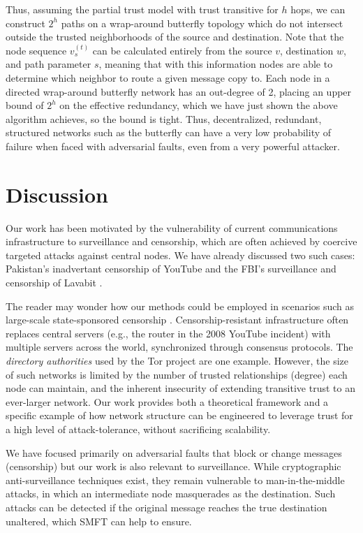 \documentclass[10pt,letterpaper]{article}
\begin{document}
Thus, assuming the partial trust model with trust transitive
for $h$ hops, we can construct $2^h$ paths on a wrap-around butterfly topology
which do not intersect outside the trusted neighborhoods of the source and
destination.
Note that the node sequence $v_s^{(t)}$ can be calculated entirely
from the source $v$, destination $w$, and path parameter $s$,
meaning that with this information nodes are able to determine which neighbor
to route a given message copy to.
Each node in a directed wrap-around butterfly network has an out-degree of 2,
placing an upper bound of $2^h$ on the effective redundancy,
which we have just shown the above algorithm achieves, so the bound is tight.
Thus, decentralized, redundant, structured networks such as the
butterfly can have a very low probability of failure when faced with
adversarial faults, even from a very powerful attacker.

\section*{Discussion}
\label{sec-discussion}

Our work has been motivated by the vulnerability of current communications
infrastructure to surveillance and censorship,
which are often achieved by coercive targeted attacks against central nodes.
We have already discussed two such cases:
Pakistan's inadvertant censorship of YouTube
\cite{hunter_pakistan_2008}
and the FBI's surveillance and censorship of Lavabit
\cite{poulsen_edward_2013}.

The reader may wonder how our methods could be employed in scenarios
such as large-scale state-sponsored censorship
\cite{xu_internet_2011}.
Censorship-resistant infrastructure often replaces central servers
(e.g., the router in the 2008 YouTube incident) with multiple servers across
the world, synchronized through consensus protocols.
The {\em directory authorities} used by the Tor project
\cite{dingledine_tor:_2004} are one example.
However, the size of such networks is limited by the number of
trusted relationships (degree) each node can maintain, and the inherent insecurity of
extending transitive trust to an ever-larger network.
Our work provides both a theoretical framework
and a specific example of how network structure
can be engineered to leverage trust for a high level of attack-tolerance,
without sacrificing scalability.

We have focused primarily on adversarial faults that block or
change messages (censorship) but our work is also relevant to
surveillance.
While cryptographic anti-surveillance techniques exist,
they remain vulnerable to man-in-the-middle attacks,
in which an intermediate node masquerades as the destination.
Such attacks can be detected if the original message reaches the true
destination unaltered,
which SMFT can help to ensure.
\end{document}

